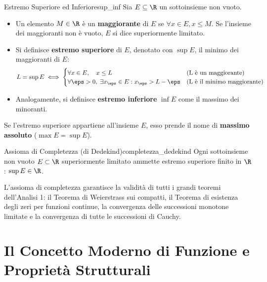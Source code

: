 \begin{definizione}{Estremo Superiore ed Inferiore}{sup_inf}
Sia $E \subseteq \R$ un sottoinsieme non vuoto.
\begin{itemize}
    \item Un elemento $M \in \R$ è un \textbf{maggiorante} di $E$ se $\forall x \in E, x \le M$. Se l'insieme dei maggioranti non è vuoto, $E$ si dice superiormente limitato.
    \item Si definisce \textbf{estremo superiore} di $E$, denotato con $\sup E$, il minimo dei maggioranti di $E$:
    \[
        L = \sup E \iff \begin{cases}
            \forall x \in E, \quad x \le L & \text{(L è un maggiorante)} \\
            \forall \eps > 0, \; \exists x_\eps \in E : x_\eps > L - \eps & \text{(L è il minimo maggiorante)}
        \end{cases}
    \]
    \item Analogamente, si definisce \textbf{estremo inferiore} $\inf E$ come il massimo dei minoranti.
\end{itemize}
Se l'estremo superiore appartiene all'insieme $E$, esso prende il nome di \textbf{massimo assoluto} ($\max E = \sup E$).
\end{definizione}

\begin{teorema}{Assioma di Completezza (di Dedekind)}{completezza_dedekind}
Ogni sottoinsieme non vuoto $E \subset \R$ superiormente limitato ammette estremo superiore finito in $\R$: $\sup E \in \R$.
\end{teorema}

\begin{osservazione}
L'assioma di completezza garantisce la validità di tutti i grandi teoremi dell'Analisi 1: il Teorema di Weierstrass sui compatti, il Teorema di esistenza degli zeri per funzioni continue, la convergenza delle successioni monotone limitate e la convergenza di tutte le successioni di Cauchy.
\end{osservazione}

\section{Il Concetto Moderno di Funzione e Proprietà Strutturali}
\label{sec:funzioni_proprieta}

